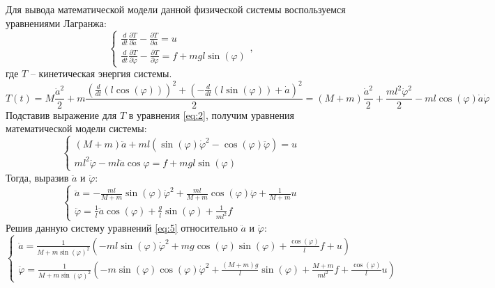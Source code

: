 Для вывода математической модели данной физической системы воспользуемся уравнениями Лагранжа:
\begin{equation} \label{eq:2}
    \begin{cases}
        \frac{d}{dt}\frac{\partial T}{\partial \dot{a}} - \frac{\partial T}{\partial a} = u \\
        \frac{d}{dt}\frac{\partial T}{\partial \dot{\varphi}} - \frac{\partial T}{\partial \varphi} = f + mgl\sin(\varphi)
    \end{cases},
\end{equation}
где $T$ -- кинетическая энергия системы.
\begin{equation} \label{eq:3}
    T(t) = M\frac{\dot{a}^2}{2} + m\frac{(\frac{d}{dt}(l\cos(\varphi)))^2 + (-\frac{d}{dt}(l\sin(\varphi)) + \dot{a})^2}{2}=
    (M+m)\frac{\dot{a}^2}{2} + \frac{ml^2\dot{\varphi}^2}{2} - ml\cos(\varphi)\dot{a}\dot{\varphi}
\end{equation}
Подставив выражение для $T$ в уравнения \ref{eq:2}, получим уравнения математической модели системы:
\begin{equation} \label{eq:4}
    \begin{cases}
        (M+m)\ddot{a} + ml(\sin(\varphi)\dot{\varphi}^2 - \cos(\varphi)\ddot{\varphi}) = u \\
        ml^2\ddot{\varphi} - ml\ddot{a}\cos{\varphi} = f + mgl\sin(\varphi)
    \end{cases}
\end{equation}
Тогда, выразив $\ddot{a}$ и $\ddot{\varphi}$:
\begin{equation} \label{eq:5}
    \begin{cases}
        \ddot a = -\frac{ml}{M+m}\sin(\varphi)\dot{\varphi}^2 + \frac{ml}{M+m}\cos(\varphi)\ddot{\varphi} + \frac{1}{M+m}u \\
        \ddot \varphi = \frac{1}{l}\ddot a \cos(\varphi) + \frac{g}{l}\sin(\varphi) + \frac{1}{ml^2}f
    \end{cases}
\end{equation}
Решив данную систему уравнений \ref{eq:5} относительно $\ddot a$ и $\ddot \varphi$:
\begin{equation} \label{eq:6}
    \begin{cases}
        \ddot a = \frac{1}{M + m\sin(\varphi)^2}( -ml\sin(\varphi)\dot{\varphi}^2 + mg\cos(\varphi)\sin(\varphi) + \frac{\cos(\varphi)}{l}f + u ) \\
        \ddot \varphi = \frac{1}{M + m\sin(\varphi)^2}( -m\sin(\varphi)\cos(\varphi)\dot{\varphi}^2 + \frac{(M+m)g}{l}\sin(\varphi) + \frac{M+m}{ml^2}f + \frac{\cos(\varphi)}{l}u )
    \end{cases}
\end{equation}

